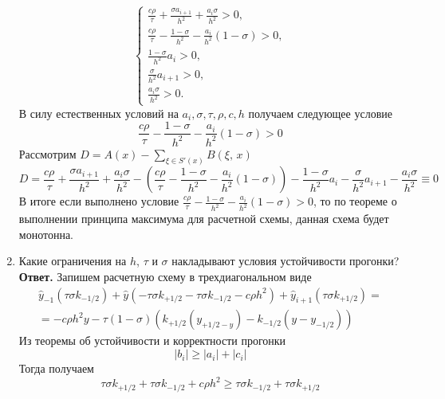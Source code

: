 \documentclass{article}
\begin{document}
\begin{enumerate}
\begin{equation*}
			\begin{cases}
				\frac{c \rho }{\tau} + \frac{\sigma a_{i+1}}{h^2} + \frac{a_i \sigma}{h^2} > 0, \\ 
				\frac{c \rho}{\tau}- \frac{1-\sigma}{h^2} - \frac{a_i}{h^2}(1-\sigma) > 0, \\
				\frac{1-\sigma}{h^2} a_i > 0, \\ 
				\frac{\sigma}{h^2} a_{i+1} > 0, \\ 
				\frac{a_i \sigma}{h^2} > 0.
			\end{cases}
		\end{equation*}
		В силу естественных условий на $a_i, \sigma, \tau, \rho, c, h$ получаем следующее условие 
		\begin{equation*}
			\frac{c \rho}{\tau}- \frac{1-\sigma}{h^2} - \frac{a_i}{h^2}(1-\sigma) > 0
		\end{equation*}
		Рассмотрим $D = A(x) - \sum\limits_{\xi \in S'(x)} B(\xi, \, x)$
		\begin{equation*}
			D = \frac{c \rho }{\tau} + \frac{\sigma a_{i+1}}{h^2} + \frac{a_i \sigma}{h^2} - 
			(\frac{c \rho}{\tau}- \frac{1-\sigma}{h^2} - \frac{a_i}{h^2}(1-\sigma)) -
			\frac{1-\sigma}{h^2} a_i - \frac{\sigma}{h^2} a_{i+1} - \frac{a_i \sigma}{h^2} \equiv 0
		\end{equation*}
		В итоге если выполнено условие $\frac{c \rho}{\tau}- \frac{1-\sigma}{h^2} - \frac{a_i}{h^2}(1-\sigma) > 0$, то по
		теореме о выполнении принципа максимума для расчетной схемы, данная схема будет монотонна. 
		\item Какие ограничения на $h$, $\tau$ и $\sigma$ накладывают условия
		устойчивости прогонки?
		\newline
		{\bfseries Ответ. } 
		Запишем расчетную схему в трехдиагональном виде 
		\begin{gather*}
			\hat{y}_{-1} (\tau \sigma k_{-1/2}) + \hat{y} (-\tau \sigma k_{+1/2}
			 - \tau \sigma k_{-1/2} - c \rho h^2) + \hat{y}_{i+1} (\tau \sigma k_{+1/2})= \\=
			 -c \rho h^2 y - \tau (1-\sigma) (k_{+1/2}(y_{+1/2 - y}) - k_{-1/2} (y - y_{-1/2}))
		\end{gather*}
		Из теоремы об устойчивости и корректности прогонки 
		\begin{equation*}
			|b_i| \geqslant |a_i| + |c_i|
		\end{equation*}
		Тогда получаем
		\begin{equation*}
			\tau \sigma k_{+1/2}
			+ \tau \sigma k_{-1/2} + c \rho h^2 \geqslant \tau \sigma k_{-1/2} + \tau \sigma k_{+1/2}

\end{equation*}
\end{enumerate}
\end{document}
